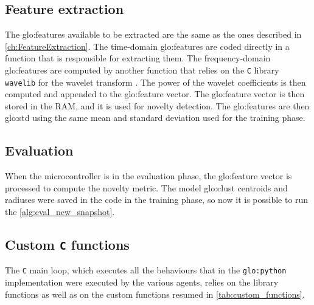 \subsection{Feature extraction}
The \gls{glo:feature}s available to be extracted are the same as the ones described in \autoref{ch:FeatureExtraction}. The time-domain \gls{glo:feature}s are coded directly in a function that is responsible for extracting them. The frequency-domain \gls{glo:feature}s are computed by another function that relies on the \texttt{C} library \texttt{wavelib} for the wavelet transform \cite{wavelib}. The power of the wavelet coefficients is then computed and appended to the \gls{glo:feature} vector. The \gls{glo:feature} vector is then stored in the RAM, and it is used for novelty detection.
The \gls{glo:feature}s are then \gls{glo:std} using the same mean and standard deviation used for the training phase. 

\subsection{Evaluation}
When the microcontroller is in the evaluation phase, the \gls{glo:feature} vector is processed to compute the novelty metric. The model \gls{glo:clust} centroids and radiuses were saved in the code in the training phase, so now it is possible to run the \autoref{alg:eval_new_snapshot}. 

\subsection{Custom \texttt{C} functions}
The \texttt{C} main loop, which executes all the behaviours that in the \texttt{\gls{glo:python}} implementation were executed by the various agents, relies on the library functions as well as on the custom functions resumed in \autoref{tab:custom_functions}.

